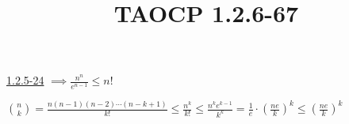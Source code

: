 \documentclass{article}
\title{TAOCP 1.2.6\mbox{-}67}
\begin{document}
\maketitle

\href{../1.2.5. Permutations and Factorials/1.2.5-24.pdf}{1.2.5\mbox{-}24} \( \implies \frac{n^{n}}{e^{n-1}} \leq n! \)

\( \binom{n}{k} = \frac{n(n-1)(n-2)\cdots(n-k+1)}{k!} \leq \frac{n^{k}}{k!} \leq \frac{n^{k} e^{k-1}}{k^{k}} = \frac{1}{e} \cdot {(\frac{ne}{k})}^{k} \leq {(\frac{ne}{k})}^{k} \)
\end{document}

